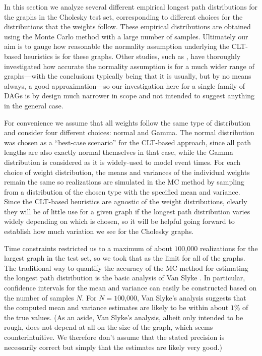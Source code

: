 \documentclass[12pt]{article}
\begin{document}
In this section we analyze several different empirical longest path distributions for the graphs in the Cholesky test set, corresponding to different choices for the distributions that the weights follow. These empirical distributions are obtained using the Monte Carlo method with a large number of samples. Ultimately our aim is to gauge how reasonable the normality assumption underlying the CLT-based heuristics is for these graphs. Other studies, such as \cite{can16}, have thoroughly investigated how accurate the normality assumption is for a much wider range of graphs---with the conclusions typically being that it is usually, but by no means always, a good approximation---so our investigation here for a single family of DAGs is by design much narrower in scope and not intended to suggest anything in the general case.

For convenience we assume that all weights follow the same type of distribution and consider four different choices: normal and Gamma. The normal distribution was chosen as a ``best-case scenario'' for the CLT-based approach, since all path lengths are also exactly normal themselves in that case, while the Gamma distribution is considered as it is widely-used to model event times. For each choice of weight distribution, the means and variances of the individual weights remain the same so realizations are simulated in the MC method by sampling from a distribution of the chosen type with the specified mean and variance. Since the CLT-based heuristics are agnostic of the weight distributions, clearly they will be of little use for a given graph if the longest path distribution varies widely depending on which is chosen, so it will be helpful going forward to establish how much variation we see for the Cholesky graphs.

Time constraints restricted us to a maximum of about $100$,$000$ realizations for the largest graph in the test set, so we took that as the limit for all of the graphs. The traditional way to quantify the accuracy of the MC method for estimating the longest path distribution is the basic analysis of Van Slyke \cite{van63}. In particular, confidence intervals for the mean and variance can easily be constructed based on the number of samples $N$. For $N = 100$,$000$, Van Slyke's analysis suggests that the computed mean and variance estimates are likely to be within about $1\%$ of the true values. (As an aside, Van Slyke's analysis, albeit only intended to be rough, does not depend at all on the size of the graph, which seems counterintuitive. We therefore don't assume that the stated precision is necessarily correct but simply that the estimates are likely very good.)
\end{document}
